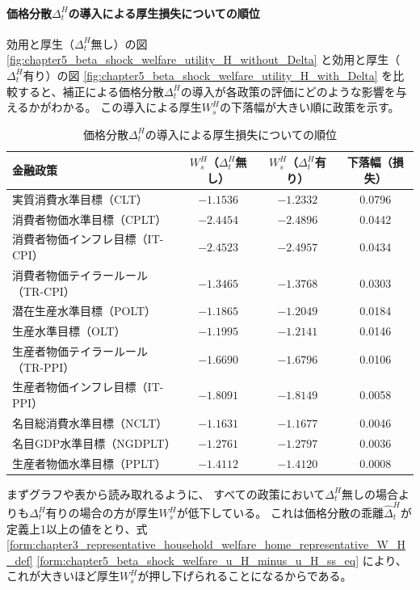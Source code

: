 \paragraph{価格分散\(\Delta_t^H\)の導入による厚生損失についての順位}
\label{sec:chapter5_beta_shock_delta}
効用と厚生（\(\Delta_t^H\)無し）の図
\ref{fig:chapter5_beta_shock_welfare_utility_H_without_Delta}
と効用と厚生（\(\Delta_t^H\)有り）の図
\ref{fig:chapter5_beta_shock_welfare_utility_H_with_Delta}
を比較すると、補正による価格分散\(\Delta_t^H\)の導入が各政策の評価にどのような影響を与えるかがわかる。
この導入による厚生\(W_s^H\)の下落幅が大きい順に政策を示す。
\begin{table}[H]
\centering
\caption{価格分散\(\Delta_t^H\)の導入による厚生損失についての順位}
\label{tab:chapter5_beta_shock_delta}
\begin{tabular}{lccc}
\hline
金融政策 & \(W_s^H\)（\(\Delta_t^H\)無し） & \(W_s^H\)（\(\Delta_t^H\)有り） & 下落幅（損失） \\
\hline
実質消費水準目標（CLT） & $-1.1536$ & $-1.2332$ & 0.0796 \\
消費者物価水準目標（CPLT） & $-2.4454$ & $-2.4896$ & 0.0442 \\
消費者物価インフレ目標（IT-CPI） & $-2.4523$ & $-2.4957$ & 0.0434 \\
消費者物価テイラールール（TR-CPI） & $-1.3465$ & $-1.3768$ & 0.0303 \\
潜在生産水準目標（POLT） & $-1.1865$ & $-1.2049$ & 0.0184 \\
生産水準目標（OLT） & $-1.1995$ & $-1.2141$ & 0.0146 \\
生産者物価テイラールール（TR-PPI） & $-1.6690$ & $-1.6796$ & 0.0106 \\
生産者物価インフレ目標（IT-PPI） & $-1.8091$ & $-1.8149$ & 0.0058 \\
名目総消費水準目標（NCLT） & $-1.1631$ & $-1.1677$ & 0.0046 \\
名目GDP水準目標（NGDPLT） & $-1.2761$ & $-1.2797$ & 0.0036 \\
生産者物価水準目標（PPLT） & $-1.4112$ & $-1.4120$ & 0.0008 \\
\hline
\end{tabular}
\end{table}
まずグラフや表から読み取れるように、
すべての政策において\(\Delta_t^H\)無しの場合よりも\(\Delta_t^H\)有りの場合の方が厚生\(W_s^H\)が低下している。
これは価格分散の乖離\(\hat{\Delta}_t^H\)が定義上1以上の値をとり、式
\eqref{form:chapter3_representative_household_welfare_home_representative_W_H_def}
\eqref{form:chapter5_beta_shock_welfare_u_H_minus_u_H_ss_eq}
により、これが大きいほど厚生\(W_s^H\)が押し下げられることになるからである。